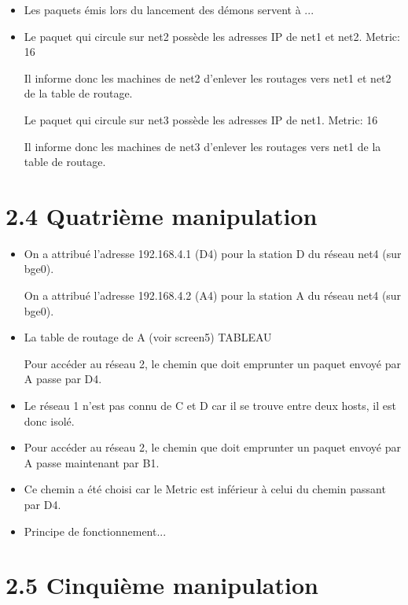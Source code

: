 \documentclass{article}
\begin{document}
\begin{itemize}\renewcommand{\labelitemi}{$\bullet$}
\item Les paquets émis lors du lancement des démons servent à ...
\item Le paquet qui circule sur net2 possède les adresses IP de net1 et net2. Metric: 16

Il informe donc les machines de net2 d'enlever les routages vers net1 et net2 de la table de routage.

Le paquet qui circule sur net3 possède les adresses IP de net1. Metric: 16

Il informe donc les machines de net3 d'enlever les routages vers net1 de la table de routage.
\end{itemize}


\section*{2.4 Quatrième manipulation}

\begin{itemize}\renewcommand{\labelitemi}{$\bullet$}
\item On a attribué l'adresse 192.168.4.1 (D4) pour la station D du réseau net4 (sur bge0).

On a attribué l'adresse 192.168.4.2 (A4) pour la station A du réseau net4 (sur bge0).
\item La table de routage de A (voir screen5) TABLEAU

Pour accéder au réseau 2, le chemin que doit emprunter un paquet envoyé par A passe par D4.
\item Le réseau 1 n'est pas connu de C et D car il se trouve entre deux hosts, il est donc isolé.

\item Pour accéder au réseau 2, le chemin que doit emprunter un paquet envoyé par A passe maintenant par B1.

\item Ce chemin a été choisi car le Metric est inférieur à celui du chemin passant par D4.

\item Principe de fonctionnement...
\end{itemize}


\section*{2.5 Cinquième manipulation}
\end{document}
